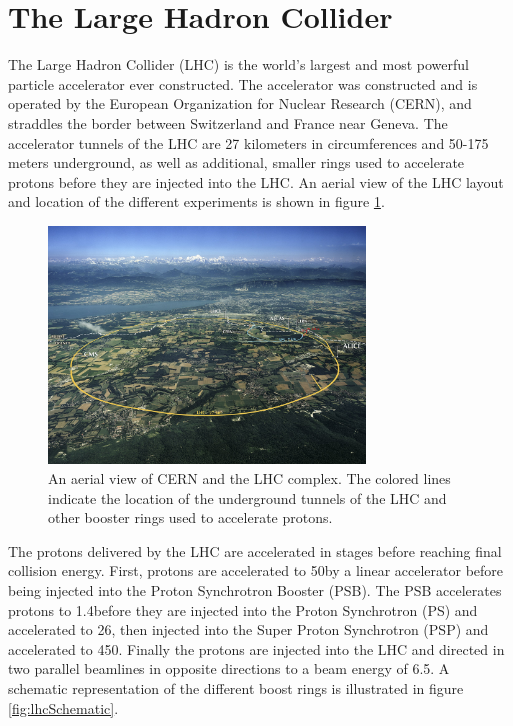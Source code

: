 \section{The Large Hadron Collider}
\label{sec:lhc}

The Large Hadron Collider (LHC) is the world's largest and most powerful particle accelerator ever constructed. The accelerator was constructed and is operated by the European Organization for Nuclear Research (CERN), and straddles the border between Switzerland and France near Geneva. The accelerator tunnels of the LHC are 27 kilometers in circumferences and 50-175 meters underground, as well as additional, smaller rings used to accelerate protons before they are injected into the LHC. An aerial view of the LHC layout and location of the different experiments is shown in figure \ref{fig:lhcAerial}.

\begin{figure}
	\centering
	\includegraphics[width=0.75\textwidth]{detector/figs/2048px-CERN_Aerial_View.jpg}
	\caption{An aerial view of CERN and the LHC complex. The colored lines indicate the location of the underground tunnels of the LHC and other booster rings used to accelerate protons. \cite{cc}}
	\label{fig:lhcAerial}
\end{figure}

The protons delivered by the LHC are accelerated in stages before reaching final collision energy. First, protons are accelerated to 50\MeV by a linear accelerator before being injected into the Proton Synchrotron Booster (PSB). The PSB accelerates protons to 1.4\GeV before they are injected into the Proton Synchrotron (PS) and accelerated to 26\GeV, then injected into the Super Proton Synchrotron (PSP) and accelerated to 450\GeV. Finally the protons are injected into the LHC and directed in two parallel beamlines in opposite directions to a beam energy of 6.5\TeV. A schematic representation of the different boost rings is illustrated in figure \ref{fig:lhcSchematic}. 

